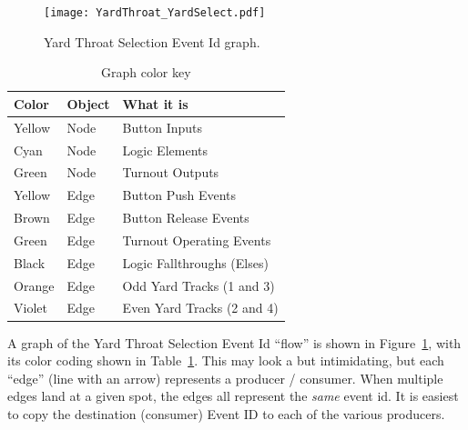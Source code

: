 \begin{figure}[hbpt]\begin{centering}%
\texttt{[image: YardThroat\_YardSelect.pdf]}
\caption{Yard Throat Selection Event Id graph.}
\label{fig:YardThroatYardSelect}
\end{centering}\end{figure}
\begin{table}[hbpt]\begin{centering}%
\begin{tabular}{|l|l|p{2in}|}
\hline
Color&Object&What it is\\
\hline
Yellow&Node&Button Inputs\\
\hline
Cyan&Node&Logic Elements\\
\hline
Green&Node&Turnout Outputs\\
\hline 
Yellow&Edge&Button Push Events\\
\hline
Brown&Edge&Button Release Events\\
\hline
Green&Edge&Turnout Operating Events\\
\hline
Black&Edge&Logic Fallthroughs (Elses)\\
\hline
Orange&Edge&Odd Yard Tracks (1 and 3)\\
\hline
Violet&Edge&Even Yard Tracks (2 and 4)\\
\hline
\end{tabular}
\caption{Graph color key}
\label{tab:YardThroatYardSelect}
\end{centering}\end{table}

A graph of the Yard Throat Selection Event Id ``flow'' is shown in
Figure~\ref{fig:YardThroatYardSelect}, with its color coding shown in
Table~\ref{tab:YardThroatYardSelect}. This may look a but intimidating, but
each ``edge'' (line with an arrow) represents a producer / consumer. When
multiple edges land at a given spot, the edges all represent the \textit{same}
event id. It is easiest to copy the destination (consumer) Event ID to each of
the various producers. 

